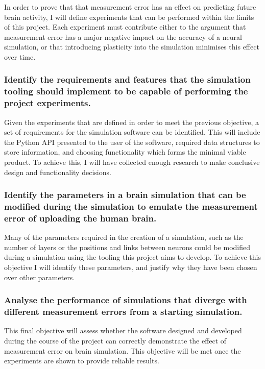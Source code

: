 In order to prove that that
measurement error has an effect on predicting future brain activity, I will
define experiments that can be performed within the limits of this project. Each
experiment must contribute either to the argument that measurement error has a
major negative impact on the accuracy of a neural simulation, or that
introducing plasticity into the simulation minimises this effect over time.


\subsubsection{Identify the requirements and features that the simulation
      tooling should implement to be capable of performing the project experiments.}

Given the experiments that are defined in order to meet the previous objective,
a set of requirements for the simulation software can be identified. This will
include the Python API presented to the user of the software, required data
structures to store information, and choosing functionality which forms the
minimal viable product. To achieve this, I will have collected enough research
to make conclusive design and functionality decisions.


\subsubsection{Identify
      the parameters in a brain simulation that can be modified during the simulation
      to emulate the measurement error of uploading the human brain.}

Many of the parameters required in the creation of a simulation, such as the
number of layers or the positions and links between neurons could be modified
during a simulation using the tooling this project aims to develop. To achieve
this objective I will identify these parameters, and justify why they have been
chosen over other parameters.


\subsubsection{Analyse the performance of simulations
      that diverge with different measurement errors from a starting simulation.}

This final objective will assess whether the software designed and developed
during the course of the project can correctly demonstrate the effect of
measurement error on brain simulation. This objective will be met once the
experiments are shown to provide reliable results.

